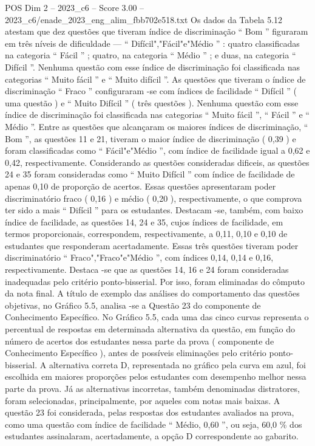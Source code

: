 \begin{textsample}{POS Dim 2 – 2023\_c6 – Score 3.00 – 2023\_c6/enade\_2023\_eng\_alim\_fbb702e518.txt}
Os dados da Tabela 5.12 atestam que dez questões que tiveram índice de discriminação “ Bom ” figuraram em três níveis de dificuldade — “ Difícil","Fácil"e"Médio ” : quatro classificadas na categoria “ Fácil ” ; quatro, na categoria “ Médio ” ; e duas, na categoria “ Difícil ”.
Nenhuma questão com esse índice de discriminação foi classificada nas categorias “ Muito fácil ” e “ Muito difícil ”.
As questões que tiveram o índice de discriminação “ Fraco ” configuraram -se com índices de facilidade “ Difícil ” ( uma questão ) e “ Muito Difícil ” ( três questões ).
Nenhuma questão com esse índice de discriminação foi classificada nas categorias “ Muito fácil ”, “ Fácil ” e “ Médio ”.
Entre as questões que alcançaram os maiores índices de discriminação, “ Bom ”, as questões 11 e 21, tiveram o maior índice de discriminação ( 0,39 ) e foram classificadas como “ Fácil"e"Médio ”, com índice de facilidade igual a 0,62 e 0,42, respectivamente.
Considerando as questões consideradas dificeis, as questões 24 e 35 foram consideradas como “ Muito Difícil ” com índice de facilidade de apenas 0,10 de proporção de acertos.
Essas questões apresentaram poder discriminatório fraco ( 0,16 ) e médio ( 0,20 ), respectivamente, o que comprova ter sido a mais “ Difícil ” para os estudantes.
Destacam -se, também, com baixo índice de facilidade, as questões 14, 24 e 35, cujos índices de facilidade, em termos proporcionais, correspondem, respectivamente, a 0,11, 0,10 e 0,10 de estudantes que responderam acertadamente.
Essas três questões tiveram poder discriminatório “ Fraco","Fraco"e"Médio ”, com índices 0,14, 0,14 e 0,16, respectivamente.
Destaca -se que as questões 14, 16 e 24 foram consideradas inadequadas pelo critério ponto-bisserial.
Por isso, foram eliminadas do cômputo da nota final.
A título de exemplo das análises do comportamento das questões objetivas, no Gráfico 5.5, analisa -se a Questão 23 do componente de Conhecimento Específico.
No Gráfico 5.5, cada uma das cinco curvas representa o percentual de respostas em determinada alternativa da questão, em função do número de acertos dos estudantes nessa parte da prova ( componente de Conhecimento Específico ), antes de possíveis eliminações pelo critério ponto-bisserial.
A alternativa correta D, representada no gráfico pela curva em azul, foi escolhida em maiores proporções pelos estudantes com desempenho melhor nessa parte da prova.
Já as alternativas incorretas, também denominadas distratores, foram selecionadas, principalmente, por aqueles com notas mais baixas.
A questão 23 foi considerada, pelas respostas dos estudantes avaliados na prova, como uma questão com índice de facilidade “ Médio, 0,60 ”, ou seja, 60,0 \% dos estudantes assinalaram, acertadamente, a opção D correspondente ao gabarito.

\end{textsample}
